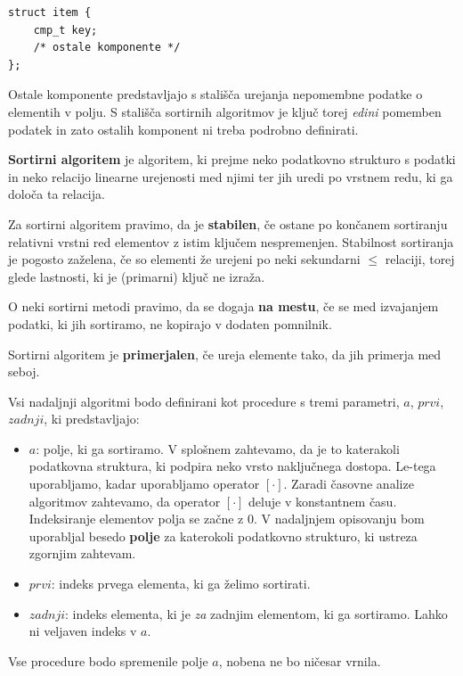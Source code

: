 \documentclass[a4paper,oneside,10pt]{article}
\begin{document}
\begin{lstlisting}
struct item {
    cmp_t key;
    /* ostale komponente */
};
\end{lstlisting}

Ostale komponente predstavljajo s stališča urejanja nepomembne podatke o elementih v
polju.
S stališča sortirnih algoritmov je ključ torej \emph{edini} pomemben podatek in zato
ostalih komponent ni treba podrobno definirati.

\begin{definicija}
  \textbf{Sortirni algoritem} je algoritem, ki prejme neko podatkovno strukturo s podatki
  in neko relacijo linearne urejenosti med njimi ter jih uredi po vrstnem redu, ki ga določa ta
  relacija.
\end{definicija}

\begin{definicija}
  Za sortirni algoritem pravimo, da je \textbf{stabilen}, če ostane po končanem sortiranju
  relativni vrstni red elementov z istim ključem nespremenjen.
  Stabilnost sortiranja je pogosto zaželena, če so elementi že urejeni po neki
  sekundarni $\leq$ relaciji, torej glede lastnosti, ki je (primarni) ključ ne izraža.
\end{definicija}

\begin{definicija}
  O neki sortirni metodi pravimo, da se dogaja \textbf{na mestu}, če se med izvajanjem podatki, ki
  jih sortiramo, ne kopirajo v dodaten pomnilnik.
\end{definicija}

\begin{definicija}
  Sortirni algoritem je \textbf{primerjalen}, če ureja elemente tako, da jih primerja med seboj.
\end{definicija}


Vsi nadaljnji algoritmi bodo definirani kot procedure s tremi parametri, $a$, $prvi$,
$zadnji$, ki predstavljajo:
\begin{itemize}
  \item $a$: polje, ki ga sortiramo. V splošnem zahtevamo, da je to katerakoli podatkovna
    struktura, ki podpira neko vrsto naključnega dostopa. Le-tega uporabljamo, kadar 
    uporabljamo operator $[\cdot]$. Zaradi časovne analize algoritmov zahtevamo, da operator 
    $[\cdot]$ deluje v konstantnem času. Indeksiranje elementov polja se začne z 0.
    V nadaljnjem opisovanju bom uporabljal besedo
    \textbf{polje} za katerokoli podatkovno strukturo, ki ustreza zgornjim zahtevam.
  \item $prvi$: indeks prvega elementa, ki ga želimo sortirati.
  \item $zadnji$: indeks elementa, ki je \emph{za} zadnjim elementom, ki ga sortiramo. Lahko ni
    veljaven indeks v $a$.
\end{itemize}
Vse procedure bodo spremenile polje $a$, nobena ne bo ničesar vrnila.
\end{document}
